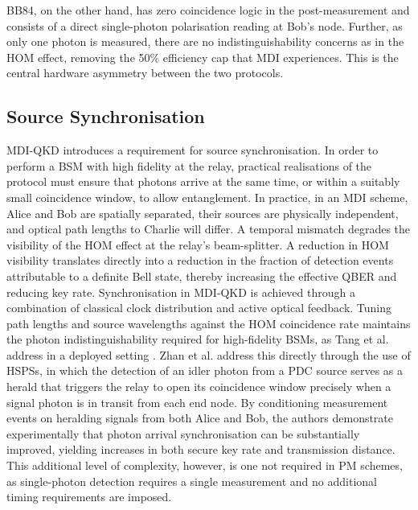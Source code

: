 \documentclass[9pt,technote]{IEEEtran}
\begin{document}
BB84, on the other hand, has zero coincidence logic in the post-measurement and consists of a direct single-photon polarisation reading at Bob's node. Further, as only one photon is measured, there are no indistinguishability concerns as in the HOM effect, removing the 50\% efficiency cap that MDI experiences. This is the central hardware asymmetry between the two protocols.

\subsection*{Source Synchronisation}
MDI-QKD introduces a requirement for source synchronisation. In order to perform a BSM with high fidelity at the relay, practical realisations of the protocol must ensure that photons arrive at the same time, or within a suitably small coincidence window, to allow entanglement. In practice, in an MDI scheme, Alice and Bob are spatially separated, their sources are physically independent, and optical path lengths to Charlie will differ. A temporal mismatch degrades the visibility of the HOM effect at the relay's beam-splitter. A reduction in HOM visibility translates directly into a reduction in the fraction of detection events attributable to a definite Bell state, thereby increasing the effective QBER and reducing key rate. Synchronisation in MDI-QKD is achieved through a combination of classical clock distribution and active optical feedback. Tuning path lengths and source wavelengths against the HOM coincidence rate maintains the photon indistinguishability required for high-fidelity BSMs, as Tang et al. address in a deployed setting \cite{Tang_2016}. Zhan et al. \cite{Zhan2025} address this directly through the use of HSPSs, in which the detection of an idler photon from a PDC source serves as a herald that triggers the relay to open its coincidence window precisely when a signal photon is in transit from each end node. By conditioning measurement events on heralding signals from both Alice and Bob, the authors demonstrate experimentally that photon arrival synchronisation can be substantially improved, yielding increases in both secure key rate and transmission distance. This additional level of complexity, however, is one not required in PM schemes, as single-photon detection requires a single measurement and no additional timing requirements are imposed.
\end{document}
